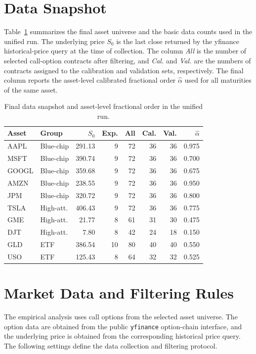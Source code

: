 \documentclass[11pt,a4paper]{report}
\begin{document}
\section{Data Snapshot}

Table~\ref{tab:repro_asset_snapshot} summarizes the final asset universe and the basic data counts used in the unified run. The underlying price $S_0$ is the last close returned by the yfinance historical-price query at the time of collection. The column \textit{All} is the number of selected call-option contracts after filtering, and \textit{Cal.} and \textit{Val.} are the numbers of contracts assigned to the calibration and validation sets, respectively. The final column reports the asset-level calibrated fractional order $\widehat{\alpha}$ used for all maturities of the same asset.

\begin{table}[htbp]
\centering
\scriptsize
\begin{tabular}{llrrrrrr}
\toprule
Asset & Group & $S_0$ & Exp. & All & Cal. & Val. & $\widehat{\alpha}$ \\
\midrule
AAPL & Blue-chip & 291.13 & 9 & 72 & 36 & 36 & 0.975 \\
MSFT & Blue-chip & 390.74 & 9 & 72 & 36 & 36 & 0.700 \\
GOOGL & Blue-chip & 359.68 & 9 & 72 & 36 & 36 & 0.675 \\
AMZN & Blue-chip & 238.55 & 9 & 72 & 36 & 36 & 0.950 \\
JPM & Blue-chip & 320.72 & 9 & 72 & 36 & 36 & 0.800 \\
TSLA & High-att. & 406.43 & 9 & 72 & 36 & 36 & 0.775 \\
GME & High-att. & 21.77 & 8 & 61 & 31 & 30 & 0.475 \\
DJT & High-att. & 7.80 & 8 & 42 & 24 & 18 & 0.150 \\
GLD & ETF & 386.54 & 10 & 80 & 40 & 40 & 0.550 \\
USO & ETF & 125.43 & 8 & 64 & 32 & 32 & 0.525 \\
\bottomrule
\end{tabular}
\caption{Final data snapshot and asset-level fractional order in the unified run.}
\label{tab:repro_asset_snapshot}
\end{table}

\section{Market Data and Filtering Rules}

The empirical analysis uses call options from the selected asset universe. The option data are obtained from the public \texttt{yfinance} option-chain interface, and the underlying price is obtained from the corresponding historical price query. The following settings define the data collection and filtering protocol.
\end{document}
